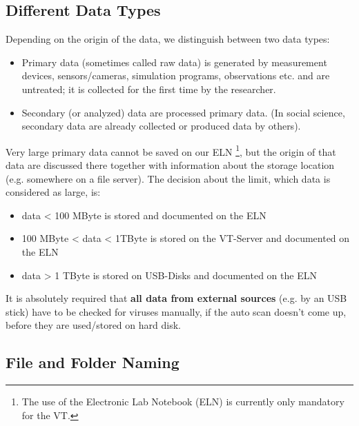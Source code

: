 \subsection{Different Data Types}
Depending on the origin of the data, we distinguish between two data types:
\begin{itemize}
  \item Primary data (sometimes called raw data) is generated by measurement
        devices, sensors/cameras, simulation programs, observations etc. and
        are untreated; it is collected for the first time by the researcher.
  \item Secondary (or analyzed) data are processed primary data. (In social
        science, secondary data are already collected or produced data by
        others).
\end{itemize}
Very large primary data cannot be saved on our ELN%
\footnote{The use of the Electronic Lab Notebook (ELN) is currently only
mandatory for the VT. },
but the origin of that data are discussed there together with information about
the storage location (e.g. somewhere on a file server). The decision about the
limit, which data is considered as large, is:
\begin{itemize}
  \item data < 100 MByte is stored and documented on the ELN
  \item 100 MByte  < data < 1TByte is stored on the VT-Server and documented
        on the ELN
  \item data > 1 TByte is stored on USB-Disks and documented on the ELN
\end{itemize}
It is absolutely required that \textbf{all data from external sources} (e.g. by an USB
stick) have to be checked for viruses manually, if the auto scan doesn’t come
up, before they are used/stored on hard disk.

\subsection{File and Folder Naming}

